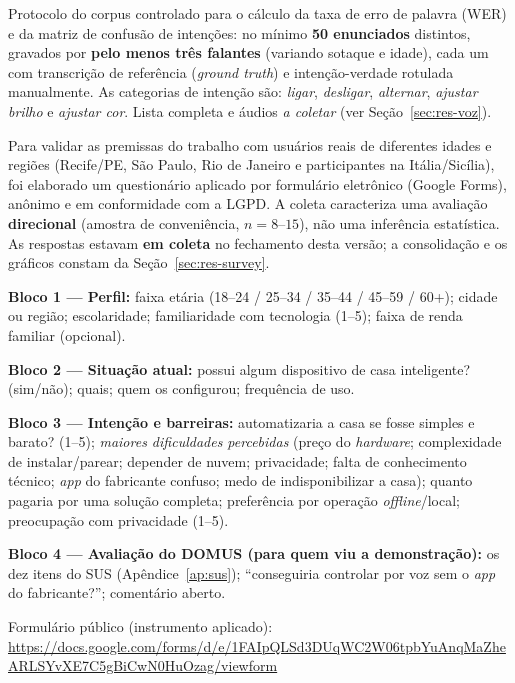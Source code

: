 Protocolo do corpus controlado para o cálculo da taxa de erro de palavra (WER) e da
matriz de confusão de intenções: no mínimo \textbf{50 enunciados} distintos, gravados
por \textbf{pelo menos três falantes} (variando sotaque e idade), cada um com
transcrição de referência (\textit{ground truth}) e intenção-verdade rotulada
manualmente. As categorias de intenção são: \emph{ligar}, \emph{desligar},
\emph{alternar}, \emph{ajustar brilho} e \emph{ajustar cor}. Lista completa e áudios
\textit{a coletar} (ver Seção~\ref{sec:res-voz}).

\label{ap:survey}

Para validar as premissas do trabalho com usuários reais de diferentes idades e
regiões (Recife/PE, São Paulo, Rio de Janeiro e participantes na Itália/Sicília), foi
elaborado um questionário aplicado por formulário eletrônico (Google Forms), anônimo e
em conformidade com a LGPD. A coleta caracteriza uma avaliação \textbf{direcional}
(amostra de conveniência, $n = 8$--$15$), não uma inferência estatística. As respostas
estavam \textbf{em coleta} no fechamento desta versão; a consolidação e os gráficos
constam da Seção~\ref{sec:res-survey}.

\vspace{0.4em}
\noindent\textbf{Bloco 1 --- Perfil:} faixa etária (18--24 / 25--34 / 35--44 / 45--59 /
60+); cidade ou região; escolaridade; familiaridade com tecnologia (1--5); faixa de
renda familiar (opcional).

\noindent\textbf{Bloco 2 --- Situação atual:} possui algum dispositivo de casa
inteligente? (sim/não); quais; quem os configurou; frequência de uso.

\noindent\textbf{Bloco 3 --- Intenção e barreiras:} automatizaria a casa se fosse simples
e barato? (1--5); \emph{maiores dificuldades percebidas} (preço do \textit{hardware};
complexidade de instalar/parear; depender de nuvem; privacidade; falta de conhecimento
técnico; \textit{app} do fabricante confuso; medo de indisponibilizar a casa); quanto
pagaria por uma solução completa; preferência por operação \textit{offline}/local;
preocupação com privacidade (1--5).

\noindent\textbf{Bloco 4 --- Avaliação do DOMUS (para quem viu a demonstração):}
os dez itens do SUS (Apêndice~\ref{ap:sus}); ``conseguiria controlar por voz sem o
\textit{app} do fabricante?''; comentário aberto.

\vspace{0.4em}
\noindent Formulário público (instrumento aplicado):
\newline\url{https://docs.google.com/forms/d/e/1FAIpQLSd3DUqWC2W06tpbYuAnqMaZheARLSYvXE7C5gBiCwN0HuOzag/viewform}

